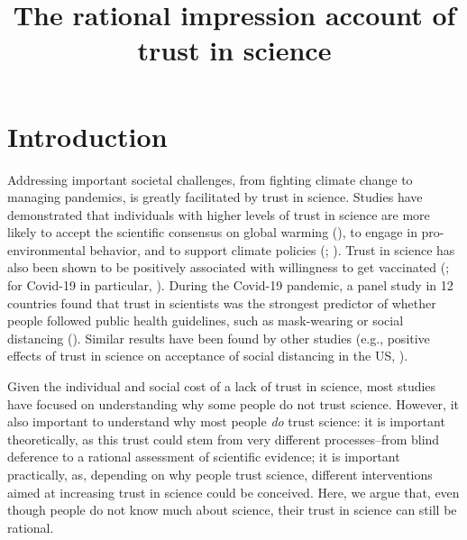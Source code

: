 \documentclass[
  jou,
  floatsintext,
  longtable,
  nolmodern,
  notxfonts,
  notimes,
  colorlinks=true,linkcolor=blue,citecolor=blue,urlcolor=blue]{apa7}
\title{The rational impression account of trust in science}
\affiliation{
{Institut Jean Nicod, Département d'études cognitives, ENS, EHESS, PSL
University, CNRS, France}}
\begin{document}
\maketitle


\setcounter{secnumdepth}{-\maxdimen} %

\setlength\LTleft{0pt}


\section{Introduction}\label{introduction}

Addressing important societal challenges, from fighting climate change
to managing pandemics, is greatly facilitated by trust in science.
Studies have demonstrated that individuals with higher levels of trust
in science are more likely to accept the scientific consensus on global
warming (), to engage in pro-environmental behavior, and to support climate
policies (;
). Trust in science has also been shown to be positively
associated with willingness to get vaccinated
(; for
Covid-19 in particular,
). During the Covid-19 pandemic, a panel study in 12 countries
found that trust in scientists was the strongest predictor of whether
people followed public health guidelines, such as mask-wearing or social
distancing (). Similar results have been found by other studies (e.g., positive
effects of trust in science on acceptance of social distancing in the
US, ).

Given the individual and social cost of a lack of trust in science, most
studies have focused on understanding why some people do not trust
science. However, it also important to understand why most people
\emph{do} trust science: it is important theoretically, as this trust
could stem from very different processes--from blind deference to a
rational assessment of scientific evidence; it is important practically,
as, depending on why people trust science, different interventions aimed
at increasing trust in science could be conceived. Here, we argue that,
even though people do not know much about science, their trust in
science can still be rational.
\end{document}
